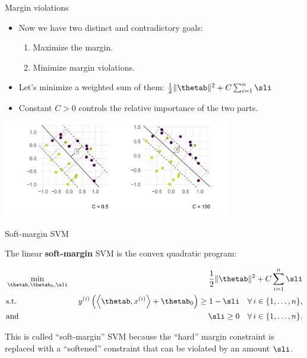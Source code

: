 \begin{vbframe}{Margin violations}

  \begin{itemize}
    \item Now we have two distinct and contradictory goals:
    \begin{enumerate}
      \item Maximize the margin.
      \item Minimize margin violations.
    \end{enumerate}
    \item Let's minimize a weighted sum of them: 
    $
    \frac{1}{2} \|\thetab\|^2 + C   \sum_{i=1}^n \sli
    $
    \item Constant $C > 0$ controls the relative importance of the two parts.
  \end{itemize}


\begin{center}
\includegraphics[width = 10cm ]{figure_man/margin.png} \\
\end{center}

\end{vbframe}

\begin{vbframe}{Soft-margin SVM}

The linear \textbf{soft-margin} SVM is the convex quadratic program:

  \begin{eqnarray*}
    & \min\limits_{\thetab, \thetab_0,\sli} & \frac{1}{2} \|\thetab\|^2 + C   \sum_{i=1}^n \sli \\
    & \text{s.t.} & \,\, \yi  \left( \scp{\thetab}{\xi} + \thetab_0 \right) \geq 1 - \sli \quad \forall\, i \in \nset,\\
    & \text{and} & \,\, \sli \geq 0 \quad \forall\, i \in \nset.\\
  \end{eqnarray*}

  This is called \enquote{soft-margin} SVM because the
  \enquote{hard} margin constraint is replaced with a \enquote{softened}
  constraint that can be violated by an amount $\sli$.\\


\end{vbframe}


